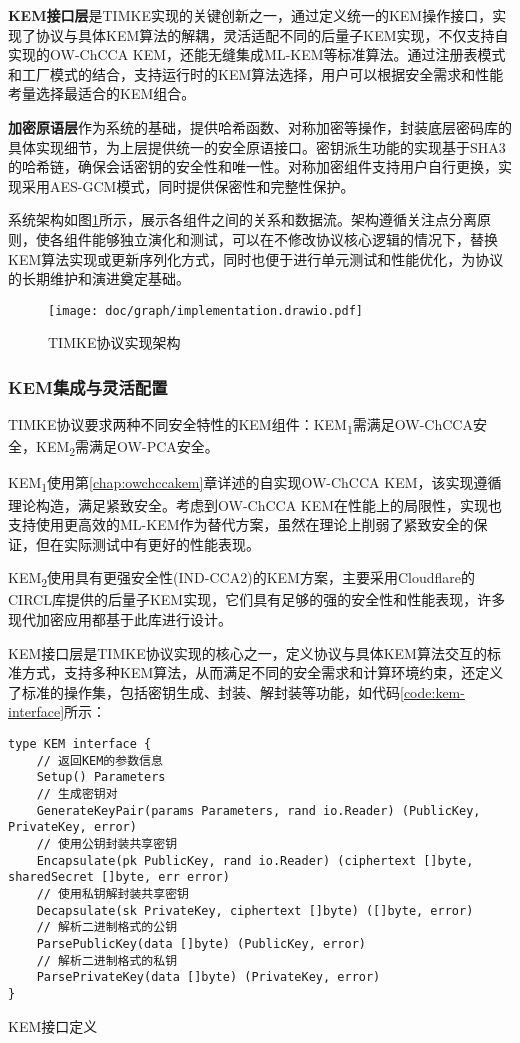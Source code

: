 \textbf{KEM接口层}是TIMKE实现的关键创新之一，通过定义统一的KEM操作接口，实现了协议与具体KEM算法的解耦，灵活适配不同的后量子KEM实现，不仅支持自实现的OW-ChCCA KEM，还能无缝集成ML-KEM等标准算法。通过注册表模式和工厂模式的结合，支持运行时的KEM算法选择，用户可以根据安全需求和性能考量选择最适合的KEM组合。

\textbf{加密原语层}作为系统的基础，提供哈希函数、对称加密等操作，封装底层密码库的具体实现细节，为上层提供统一的安全原语接口。密钥派生功能的实现基于SHA3的哈希链，确保会话密钥的安全性和唯一性。对称加密组件支持用户自行更换，实现采用AES-GCM模式，同时提供保密性和完整性保护。

系统架构如图\ref{fig:system-architecture}所示，展示各组件之间的关系和数据流。架构遵循关注点分离原则，使各组件能够独立演化和测试，可以在不修改协议核心逻辑的情况下，替换KEM算法实现或更新序列化方式，同时也便于进行单元测试和性能优化，为协议的长期维护和演进奠定基础。

\begin{figure}[ht]
  \centering
  \texttt{[image: doc/graph/implementation.drawio.pdf]}
  \caption{TIMKE协议实现架构}
  \label{fig:system-architecture}
\end{figure}


\subsubsection{KEM集成与灵活配置}
\label{subsubsec:kem_implementation}
TIMKE协议要求两种不同安全特性的KEM组件：KEM\textsubscript{1}需满足OW-ChCCA安全，KEM\textsubscript{2}需满足OW-PCA安全。

KEM\textsubscript{1}使用第\ref{chap:owchccakem}章详述的自实现OW-ChCCA KEM，该实现遵循理论构造，满足紧致安全。考虑到OW-ChCCA KEM在性能上的局限性，实现也支持使用更高效的ML-KEM作为替代方案，虽然在理论上削弱了紧致安全的保证，但在实际测试中有更好的性能表现。

KEM\textsubscript{2}使用具有更强安全性(IND-CCA2)的KEM方案，主要采用Cloudflare的CIRCL\cite{circl}库提供的后量子KEM实现，它们具有足够的强的安全性和性能表现，许多现代加密应用都基于此库进行设计。

KEM接口层是TIMKE协议实现的核心之一，定义协议与具体KEM算法交互的标准方式，支持多种KEM算法，从而满足不同的安全需求和计算环境约束，还定义了标准的操作集，包括密钥生成、封装、解封装等功能，如代码\ref{code:kem-interface}所示：

\begin{listing}[ht]
\begin{verbatim}
type KEM interface {
    // 返回KEM的参数信息
    Setup() Parameters
    // 生成密钥对
    GenerateKeyPair(params Parameters, rand io.Reader) (PublicKey, PrivateKey, error)
    // 使用公钥封装共享密钥
    Encapsulate(pk PublicKey, rand io.Reader) (ciphertext []byte, sharedSecret []byte, err error)
    // 使用私钥解封装共享密钥
    Decapsulate(sk PrivateKey, ciphertext []byte) ([]byte, error)
    // 解析二进制格式的公钥
    ParsePublicKey(data []byte) (PublicKey, error)
    // 解析二进制格式的私钥
    ParsePrivateKey(data []byte) (PrivateKey, error)
}
\end{verbatim}
\caption{KEM接口定义}
\label{code:kem-interface}
\end{listing}


